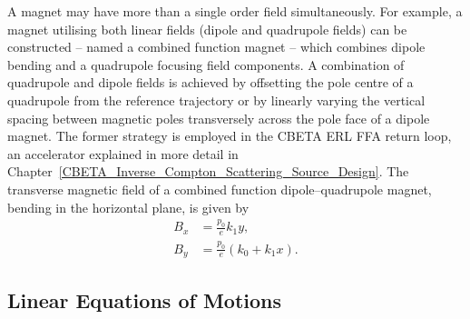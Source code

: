 \documentclass[../main.tex]{subfiles}
\begin{document}
A magnet may have more than a single order field simultaneously. For example, a magnet utilising both linear fields (dipole and quadrupole fields) can be constructed -- named a combined function magnet -- which combines dipole bending and a quadrupole focusing field components. A combination of quadrupole and dipole fields is achieved by offsetting the pole centre of a quadrupole from the reference trajectory or by linearly varying the vertical spacing between magnetic poles transversely across the pole face of a dipole magnet. The former strategy is employed in the CBETA ERL FFA return loop, an accelerator explained in more detail in Chapter~\ref{CBETA_Inverse_Compton_Scattering_Source_Design}. The transverse magnetic field of a combined function dipole--quadrupole magnet, bending in the horizontal plane, is given by 
\begin{align}
B_{x} &= \frac{p_{0}}{e}k_{1}y, \nonumber\\
B_{y} &= \frac{p_{0}}{e}\left(k_{0}+k_{1}x\right).
\label{eq:combined_function_field}    
\end{align}

\subsection{Linear Equations of Motions}
\label{sec:equations_of_motion}
\end{document}
